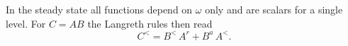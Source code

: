 \documentclass{article}
\begin{document}
In the steady state all functions depend on $\omega$ only and are scalars for a single level.
For $C = A B$ the Langreth rules then read
\begin{equation}
C^{<} = B^{<}\,A^{r} + B^{a}\,A^{<} .
\label{eq:fl}
\end{equation}
\end{document}
